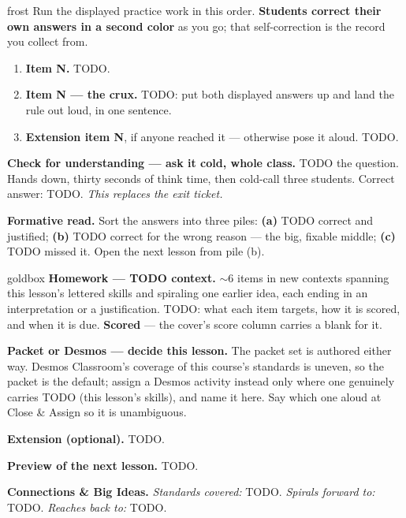 \documentclass[10pt]{article}
\begin{document}
\boxguard
\begin{skillbox}{frost}
Run the displayed practice work in this order. \textbf{Students correct their own answers in a
second color} as you go; that self-correction is the record you collect from.
\begin{enumerate}[leftmargin=1.3em, nosep, itemsep=3pt]
  \item \textbf{Item N.} TODO.
  \item \textbf{Item N --- the crux.} TODO: put both displayed answers up and land the rule
        out loud, in one sentence.
  \item \textbf{Extension item N}, if anyone reached it --- otherwise pose it aloud. TODO.
\end{enumerate}

\vspace{2pt}
\textbf{Check for understanding --- ask it cold, whole class.} TODO the question. Hands down,
thirty seconds of think time, then cold-call three students. Correct answer: TODO.
\emph{This replaces the exit ticket.}

\vspace{2pt}
\textbf{Formative read.} Sort the answers into three piles: \textbf{(a)} TODO correct and
justified; \textbf{(b)} TODO correct for the wrong reason --- the big, fixable middle;
\textbf{(c)} TODO missed it. Open the next lesson from pile (b).
\end{skillbox}

\boxguard
\begin{skillbox}{goldbox}
\textbf{Homework --- TODO context.} $\sim$6 items in new contexts spanning this lesson's lettered
skills and spiraling one earlier idea, each ending in an interpretation or a justification.
TODO: what each item targets, how it is scored, and when it is due. \textbf{Scored} --- the
cover's score column carries a blank for it.

\textbf{Packet or Desmos --- decide this lesson.} The packet set is authored either way.
Desmos Classroom's coverage of this course's standards is uneven, so the packet is the default;
assign a Desmos activity instead only where one genuinely carries TODO (this lesson's skills),
and name it here. Say which one aloud at Close \& Assign so it is unambiguous.

\textbf{Extension (optional).} TODO.

\textbf{Preview of the next lesson.} TODO.

\textbf{Connections \& Big Ideas.} \textit{Standards covered:} TODO. \textit{Spirals forward
to:} TODO. \textit{Reaches back to:} TODO.
\end{skillbox}
\end{document}

